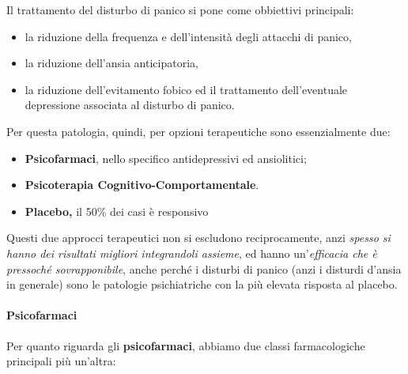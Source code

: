 Il trattamento del disturbo di panico si pone come obbiettivi
principali:

\begin{itemize}
\item
  la riduzione della frequenza e dell'intensità degli attacchi di
  panico,
\item
  la riduzione dell'ansia anticipatoria,
\item
  la riduzione dell'evitamento fobico ed il trattamento dell'eventuale
  depressione associata al disturbo di panico.
\end{itemize}

Per questa patologia, quindi, per opzioni terapeutiche sono
essenzialmente due:

\begin{itemize}
\item
  \textbf{Psicofarmaci}, nello specifico antidepressivi ed ansiolitici;
\item
  \textbf{Psicoterapia Cognitivo-Comportamentale}.
\item
  \textbf{Placebo,} il 50\% dei casi è responsivo
\end{itemize}

Questi due approcci terapeutici non si escludono reciprocamente, anzi
\emph{spesso si hanno dei risultati migliori integrandoli assieme}, ed
hanno un'\emph{efficacia che è pressoché sovrapponibile}, anche perché i
disturbi di panico (anzi i disturdi d'ansia in generale) sono le
patologie psichiatriche con la più elevata risposta al placebo.

\paragraph{Psicofarmaci}

Per quanto riguarda gli \textbf{psicofarmaci}, abbiamo due classi
farmacologiche principali più un'altra:


